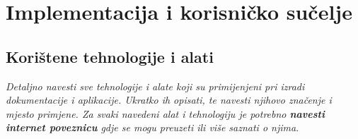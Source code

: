 \chapter{Implementacija i korisničko sučelje}
		
		
		\section{Korištene tehnologije i alati}
		
			
			 \textit{Detaljno navesti sve tehnologije i alate koji su primijenjeni pri izradi dokumentacije i aplikacije. 
			 Ukratko ih opisati, te navesti njihovo značenje i mjesto primjene. 
			 Za svaki navedeni alat i tehnologiju je potrebno \textbf{navesti internet poveznicu} gdje se mogu preuzeti ili više saznati o njima}.
			
			
			\eject 
		
	
			
			
	
			
			
			
			
			
